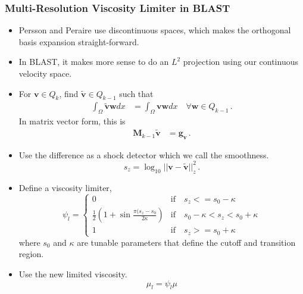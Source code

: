 \documentclass[8pt,xcolor=svgnames]{beamer}
\begin{document}
\begin{frame}\frametitle{Multi-Resolution Viscosity Limiter in BLAST}
\begin{itemize}
\item Persson and Peraire use discontinuous spaces, which makes the orthogonal basis expansion straight-forward.
\item In BLAST, it makes more sense to do an $L^2$ projection using our continuous velocity space.
\item For $\mathbf{v}\in Q_k$, find $\mathbf{\tilde v}\in Q_{k-1}$ such that
\begin{align*}
\int_\Omega \mathbf{\tilde vw}dx&=\int_\Omega \mathbf{vw}dx\quad\forall \mathbf{w}\in Q_{k-1}\,.
\end{align*}
In matrix vector form, this is
\begin{align*}
\mathbf{M}_{k-1}\mathbf{\tilde v}&=\mathbf{g_v}\,.
\end{align*}
\item Use the difference as a shock detector which we call the smoothness.
\[
s_z=\log_{10}||\mathbf{v-\tilde v}||_z^2\,.
\]
\item Define a viscosity limiter,
\[
\psi_l=
\begin{cases}
0 &\text{if}\quad s_z <= s_0-\kappa\\
\frac{1}{2}\left(1+\sin\frac{\pi(s_z-s_0}{2\kappa}\right) &\text{if}\quad s_0-\kappa < s_z < s_0 + \kappa\\
1 &\text{if}\quad s_z >= s_0 + \kappa
\end{cases}
\]
where $s_0$ and $\kappa$ are tunable parameters that define the cutoff and transition region.
\item Use the new limited viscosity.
\[
\mu_l = \psi_l\mu
\]
\end{itemize}
\end{frame}
\end{document}
